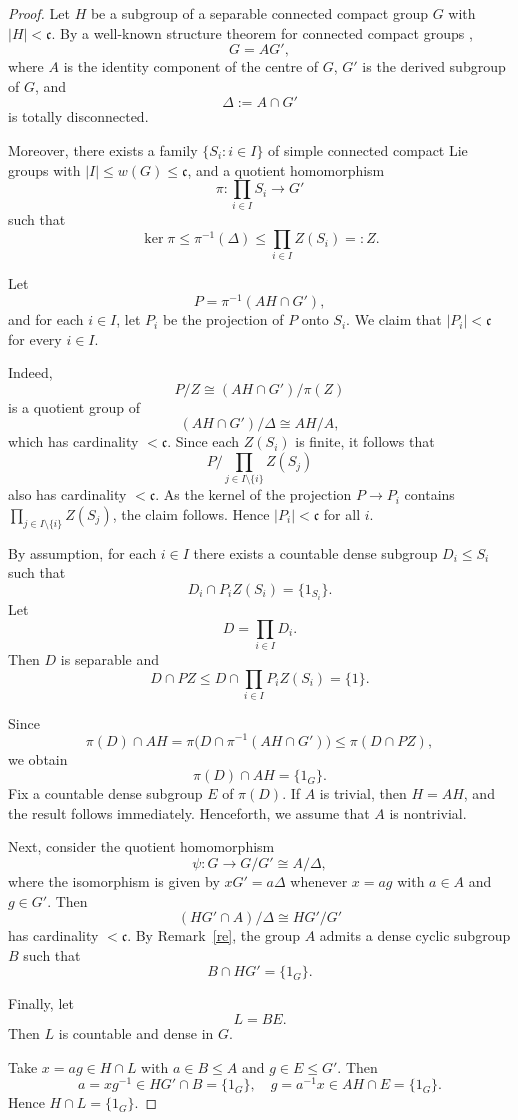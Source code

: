 \documentclass[12pt]{amsart}
\theoremstyle{definition}
\theoremstyle{remark}
\begin{document}
\begin{proof}
Let $H$ be a subgroup of a separable connected compact group $G$ with $|H|<\mathfrak{c}$.
By a well-known structure theorem for connected compact groups \cite[Theorem 9.24]{HM},
\[
G=AG',
\]
where $A$ is the identity component of the centre of $G$,
$G'$ is the derived subgroup of $G$, and
\[
\Delta:=A\cap G'
\]
is totally disconnected.

Moreover, there exists a family $\{S_i : i\in I\}$ of simple connected compact Lie groups
with $|I|\le w(G)\le \mathfrak{c}$, and a quotient homomorphism
\[
\pi:\prod_{i\in I} S_i \longrightarrow G'
\]
such that
\[
\ker\pi \le \pi^{-1}(\Delta) \le \prod_{i\in I} Z(S_i)=:Z.
\]

Let
\[
P=\pi^{-1}(AH\cap G'),
\]
and for each $i\in I$, let $P_i$ be the projection of $P$ onto $S_i$.
We claim that $|P_i|<\mathfrak{c}$ for every $i\in I$.

Indeed,
\[
P/Z \cong (AH\cap G')/\pi(Z)
\]
is a quotient group of
\[
(AH\cap G')/\Delta \cong AH/A,
\]
which has cardinality $<\mathfrak{c}$.
Since each $Z(S_i)$ is finite, it follows that
\[
P\big/\prod_{j\in I\setminus\{i\}} Z(S_j)
\]
also has cardinality $<\mathfrak{c}$.
As the kernel of the projection $P\to P_i$ contains
$\prod_{j\in I\setminus\{i\}} Z(S_j)$, the claim follows.
Hence $|P_i|<\mathfrak{c}$ for all $i$.

By assumption, for each $i\in I$ there exists a countable dense subgroup
$D_i\le S_i$ such that
\[
D_i\cap P_i Z(S_i)=\{1_{S_i}\}.
\]
Let
\[
D=\prod_{i\in I} D_i.
\]
Then $D$ is separable and
\[
D\cap PZ \le D\cap \prod_{i\in I} P_i Z(S_i)=\{1\}.
\]

Since
\[
\pi(D)\cap AH
=\pi\bigl(D\cap \pi^{-1}(AH\cap G')\bigr)
\le \pi(D\cap PZ),
\]
we obtain
\[
\pi(D)\cap AH=\{1_G\}.
\]
Fix a countable dense subgroup $E$ of $\pi(D)$.
If $A$ is trivial, then $H = A H$, and the result follows immediately.  
Henceforth, we assume that $A$ is nontrivial.


Next, consider the quotient homomorphism
\[
\psi:G\to G/G'\cong A/\Delta,
\]
where the isomorphism is given by $xG'=a\Delta$ whenever $x=ag$ with $a\in A$ and
$g\in G'$.
Then
\[
(HG'\cap A)/\Delta \cong HG'/G'
\]
has cardinality $<\mathfrak{c}$.
By Remark~\ref{re}, the group $A$ admits a dense cyclic subgroup $B$ such that
\[
B\cap HG'=\{1_G\}.
\]

Finally, let
\[
L=BE.
\]
Then $L$ is countable and dense in $G$.

Take $x=ag\in H\cap L$ with $a\in B\le A$ and $g\in E\le G'$.
Then
\[
a=xg^{-1}\in HG'\cap B=\{1_G\},
\quad
g=a^{-1}x\in AH\cap E=\{1_G\}.
\]
Hence $H\cap L=\{1_G\}$.
\end{proof}
\end{document}
